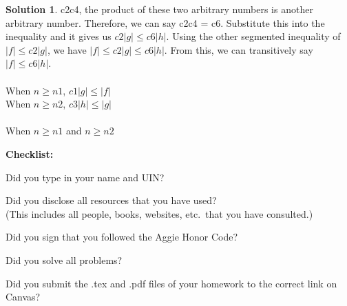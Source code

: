 \documentclass{article}
\theoremstyle{definition}
\newtheorem*{solution}{Solution}
\newcommand{\checklist}{\noindent\textbf{Checklist:}
\begin{compactitem}[$\Box$] 
\item Did you type in your name and UIN? 
\item Did you disclose all resources that you have used? \\
(This includes all people, books, websites, etc.\ that you have consulted.)
\item Did you sign that you followed the Aggie Honor Code? 
\item Did you solve all problems? 
\item Did you submit the .tex and .pdf files of your homework to the correct link on Canvas? 
\end{compactitem}
}
\begin{document}
\begin{solution}
c2c4, the product of these two arbitrary numbers is another arbitrary number. Therefore, we can say c2c4 = c6. Substitute this into the inequality and it gives us $c2 \vert g \vert \leqslant c6\vert h \vert$. Using the other segmented inequality of $\vert f \vert \leqslant c2\vert g \vert$, we have $\vert f \vert \leqslant c2\vert g \vert \leqslant c6\vert h \vert$. From this, we can transitively say $\vert f \vert \leqslant c6\vert h \vert$. \\
\\
When $n \geqslant n1$, $c1 \vert g \vert \leqslant \vert f \vert$ \\
When $n \geqslant n2$, $c3 \vert h \vert \leqslant \vert g \vert$ \\
\\
When $n \geqslant n1$ and $n \geqslant n2$
\end{solution}

\goodbreak
\checklist
\end{document}
